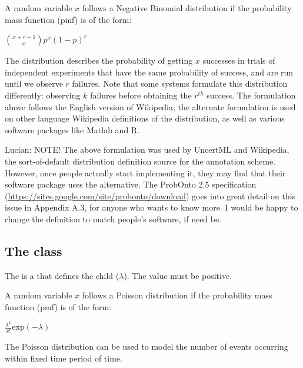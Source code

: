 A random variable $ x $ follows a Negative Binomial distribution if the probability mass function (pmf) is of the form:

\begin{center}
${x + r - 1 \choose x} p^x (1-p)^r $
\end{center}

The distribution describes the probability of getting $ x $ successes in trials of independent experiments that have the same probability of success, and are run until we observe $ r $ failures.  Note that some systems formulate this distribution differently:  observing $k$ failures before obtaining the $r^{th}$ success.  The formulation above follows the English version of Wikipedia; the alternate formulation is used on other language Wikipedia definitions of the distribution, as well as various software packages like Matlab and R.

{\color{red} Lucian: \controversial NOTE!  The above formulation was used by UncertML and Wikipedia, the sort-of-default distribution definition source for the annotation scheme.  However, once people actually start implementing it, they may find that their software package uses the alternative.  The ProbOnto 2.5 specification (\url{https://sites.google.com/site/probonto/download}) goes into great detail on this issue in Appendix A.3, for anyone who wants to know more.  I would be happy to change the definition to match people's software, if need be.}


\subsection{The  class}
\label{PoissonDistribution-class}
\label{poissondistribution-class}

The \PoissonDistribution is a \DiscreteUnivariateDistribution that defines the \UncertValue child  ($\lambda$).  The  value must be positive.

A random variable $ x $ follows a Poisson distribution if the probability mass function (pmf) is of the form:

\begin{center}
$\frac{\lambda^x}{x!} \mathrm{exp}(-\lambda)$
\end{center}

The Poisson distribution can be used to model the number of events occurring within fixed time period of time.


